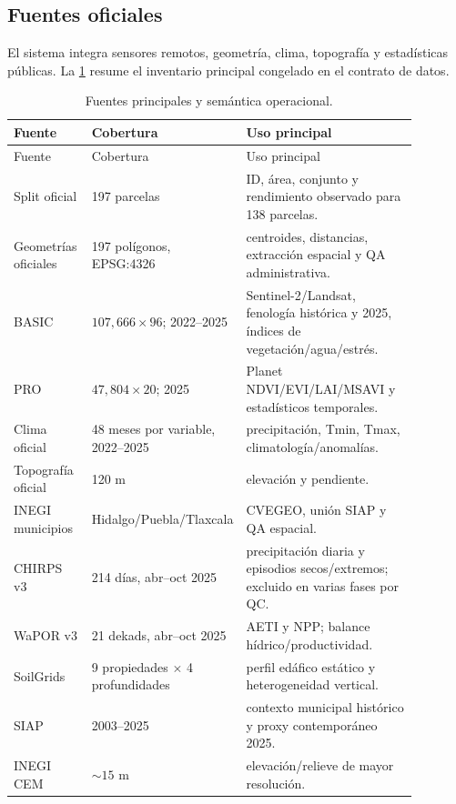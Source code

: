 \subsection{Fuentes oficiales}

El sistema integra sensores remotos, geometría, clima, topografía y estadísticas públicas.
La \cref{tab:cp01-sources} resume el inventario principal congelado en el contrato de
datos.

\begin{longtable}{p{0.20\linewidth}p{0.19\linewidth}p{0.49\linewidth}}
\caption{Fuentes principales y semántica operacional.}
\label{tab:cp01-sources}\\
\toprule
Fuente & Cobertura & Uso principal \\
\midrule
\endfirsthead
\toprule
Fuente & Cobertura & Uso principal \\
\midrule
\endhead
Split oficial & 197 parcelas & ID, área, conjunto y rendimiento observado para 138 parcelas.\\
Geometrías oficiales & 197 polígonos, EPSG:4326 & centroides, distancias, extracción espacial y QA administrativa.\\
BASIC & $107{,}666\times96$; 2022--2025 & Sentinel-2/Landsat, fenología histórica y 2025, índices de vegetación/agua/estrés.\\
PRO & $47{,}804\times20$; 2025 & Planet NDVI/EVI/LAI/MSAVI y estadísticos temporales.\\
Clima oficial & 48 meses por variable, 2022--2025 & precipitación, Tmin, Tmax, climatología/anomalías.\\
Topografía oficial & 120 m & elevación y pendiente.\\
INEGI municipios & Hidalgo/Puebla/Tlaxcala & CVEGEO, unión SIAP y QA espacial.\\
CHIRPS v3 & 214 días, abr--oct 2025 & precipitación diaria y episodios secos/extremos; excluido en varias fases por QC.\\
WaPOR v3 & 21 dekads, abr--oct 2025 & AETI y NPP; balance hídrico/productividad.\\
SoilGrids & 9 propiedades $\times$ 4 profundidades & perfil edáfico estático y heterogeneidad vertical.\\
SIAP & 2003--2025 & contexto municipal histórico y proxy contemporáneo 2025.\\
INEGI CEM & $\sim15$ m & elevación/relieve de mayor resolución.\\
\bottomrule
\end{longtable}

